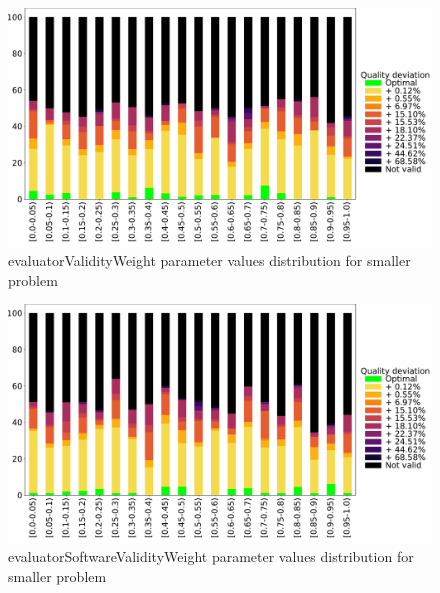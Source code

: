 \begin{figure}
	\centering
	\includegraphics[width=\textwidth]{images/DistrObj/evaluatorValidityWeight.pdf}
	\caption[evaluatorValidityWeight parameter values distribution for smaller problem]{evaluatorValidityWeight parameter values distribution for smaller problem}
	\label{fig:evaluatorValidityWeight_Obj}
\end{figure}

\begin{figure}
	\centering
	\includegraphics[width=\textwidth]{images/DistrObj/evaluatorSoftwareValidityWeight.pdf}
	\caption[evaluatorSoftwareValidityWeight parameter values distribution for smaller problem]{evaluatorSoftwareValidityWeight parameter values distribution for smaller problem}
	\label{fig:evaluatorSoftwareValidityWeight_Obj}
\end{figure}

